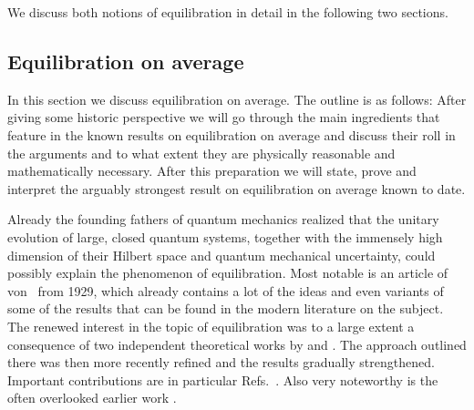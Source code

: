 \documentclass[a4paper,12pt,listof=totoc,index=totoc,bibliography=totoc,headsepline=false,headings=normal,BCOR16.153846mm,DIV12,headinclude,twoside,cleardoublepage=empty,numbers=noenddot,final]{scrreprt}
\theoremstyle{mystyle}
\numberwithin{equation}{section}
\numberwithin{figure}{section}
\numberwithin{lemma}{section}
\numberwithin{theorem}{section}
\numberwithin{corollary}{section}
\numberwithin{definition}{section}
\numberwithin{conjecture}{section}
\numberwithin{observation}{section}
\newcommand{\+}{\mkern2mu}
\DeclareMathOperator{\1}{\mathds{1}}
\begin{document}
We discuss both notions of equilibration in detail in the following two sections.


\subsection{Equilibration on average}
\label{sec:equlibrationintheweaksense}
%
In this section we discuss equilibration on average.
The outline is as follows:
After giving some historic perspective we will go through the main ingredients that feature in the known results on equilibration on average and discuss their roll in the arguments and to what extent they are physically reasonable and mathematically necessary.
After this preparation we will state, prove and interpret the arguably strongest result on equilibration on average known to date.

Already the founding fathers of quantum mechanics realized that the unitary evolution of large, closed quantum systems, together with the immensely high dimension of their Hilbert space and quantum mechanical uncertainty, could possibly explain the phenomenon of equilibration.
Most notable is an article of von~\textcite{vonneumann1929} from 1929, which already contains a lot of the ideas and even variants of some of the results that can be found in the modern literature on the subject.
The renewed interest in the topic of equilibration was to a large extent a consequence of two independent theoretical works by \textcite{Reimann08} and \textcite{Linden09}.
The approach outlined there was then more recently refined and the results gradually strengthened.
Important contributions are in particular Refs.~\cite{Reimann12,1110.5759v1,1012.4622v1}.
Also very noteworthy is the often overlooked earlier work \cite{tasaki98}.
\end{document}
